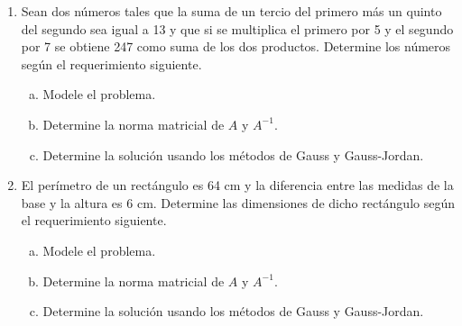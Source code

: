 \documentclass[
	spanish,
	8pt,
	utf8,
	xcolor=table,
	handout,
	aspectratio=169,
	professionalfonts,
	notheorems,
	mathserif,
]{beamer}
\newcounter{savedenum}
\newcommand*{\resume}{\setcounter{enumi}{\thesavedenum}}
\begin{document}
\begin{frame}
	\begin{enumerate}
		\resume

		\item

		      Sean dos números tales que la suma de un tercio del primero
		      más un quinto del segundo sea igual a 13 y que si se
		      multiplica el primero por 5 y el segundo por 7 se obtiene
		      247 como suma de los dos productos.
		      Determine los números según el requerimiento siguiente.

		      \begin{multicols}{2}
			      \begin{enumerate}[a)]
				      \item

				            Modele el problema.

				      \item

				            Determine la norma matricial de $A$ y $A^{-1}$.


				      \item

				            Determine la solución usando los métodos de Gauss
				            y Gauss-Jordan.
			      \end{enumerate}
		      \end{multicols}


		\item

		      El perímetro de un rectángulo es 64 cm y la diferencia entre
		      las medidas de la base y la altura es 6 cm.
		      Determine las dimensiones de dicho rectángulo según el
		      requerimiento siguiente.

		      \begin{multicols}{2}
			      \begin{enumerate}[a)]
				      \item

				            Modele el problema.

				      \item

				            Determine la norma matricial de $A$ y $A^{-1}$.

				      \item

				            Determine la solución usando los métodos de Gauss y Gauss-Jordan.
			      \end{enumerate}
		      \end{multicols}


\end{enumerate}
\end{frame}
\end{document}
